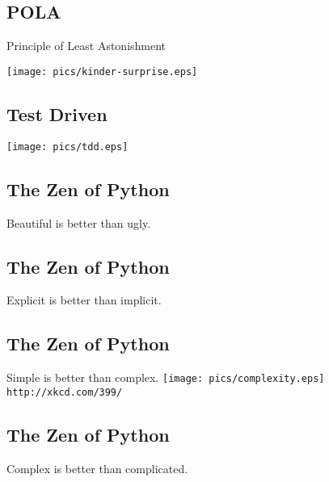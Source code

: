 \documentclass[xga]{xdvislides}
\begin{document}
\subsection{POLA}
Principle of Least Astonishment
\\
\vspace*{\fill}
\begin{center}
	\texttt{[image: pics/kinder-surprise.eps]}
\end{center}
\vspace*{\fill}

\subsection{Test Driven}
\vspace*{\fill}
\begin{center}
	\texttt{[image: pics/tdd.eps]}
\end{center}
\vspace*{\fill}


\subsection{The Zen of Python}
\Huge
\begin{center}
Beautiful is better than ugly.
\end{center}

\subsection{The Zen of Python}
\begin{center}
Explicit is better than implicit.
\end{center}

\subsection{The Zen of Python}
\begin{center}
    Simple is better than complex.
\vspace*{\fill}
	\texttt{[image: pics/complexity.eps]}
	\\
	\small \verb+http://xkcd.com/399/+
\end{center}
\vspace*{\fill}
\Huge

\subsection{The Zen of Python}
\begin{center}
    Complex is better than complicated.
\end{center}
\end{document}

